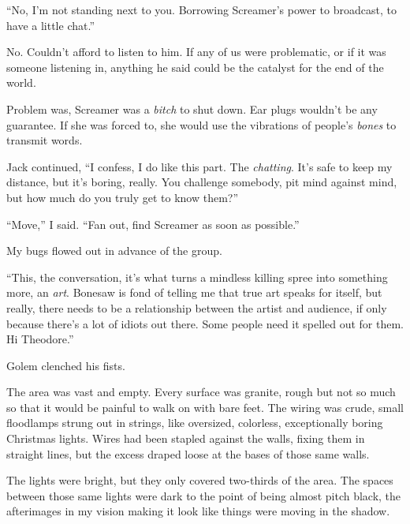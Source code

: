 ``No, I'm not standing next to you.  Borrowing Screamer's power to broadcast, to have a little chat.''



No.  Couldn't afford to listen to him.  If any of us were problematic, or if it was someone listening in, anything he said could be the catalyst for the end of the world.



Problem was, Screamer was a \emph{bitch} to shut down.  Ear plugs wouldn't be any guarantee.  If she was forced to, she would use the vibrations of people's\emph{ bone}\emph{s} to transmit words.



Jack continued, ``I confess, I do like this part.  The \emph{chatting}.  It's safe to keep my distance, but it's boring, really.  You challenge somebody, pit mind against mind, but how much do you truly get to know them?''



``Move,'' I said.  ``Fan out, find Screamer as soon as possible.''



My bugs flowed out in advance of the group.



``This, the conversation, it's what turns a mindless killing spree into something more, an \emph{art}.  Bonesaw is fond of telling me that true art speaks for itself, but really, there needs to be a relationship between the artist and audience, if only because there's a lot of idiots out there.  Some people need it spelled out for them.  Hi Theodore.''



Golem clenched his fists.



The area was vast and empty.  Every surface was granite, rough but not so much so that it would be painful to walk on with bare feet.  The wiring was crude, small floodlamps strung out in strings, like oversized, colorless, exceptionally boring Christmas lights.  Wires had been stapled against the walls, fixing them in straight lines, but the excess draped loose at the bases of those same walls.



The lights were bright, but they only covered two-thirds of the area.  The spaces between those same lights were dark to the point of being almost pitch black, the afterimages in my vision making it look like things were moving in the shadow.



